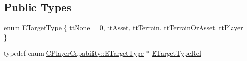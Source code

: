 \subsection*{Public Types}
\begin{DoxyCompactItemize}
\item 
enum \hyperlink{classCPlayerCapability_a9d3450ed1532fd536bd6cbb1e2eef02f}{E\+Target\+Type} \{ \newline
\hyperlink{classCPlayerCapability_a9d3450ed1532fd536bd6cbb1e2eef02fac78f0e806a6b0ead030d63c27c9ce929}{tt\+None} = 0, 
\hyperlink{classCPlayerCapability_a9d3450ed1532fd536bd6cbb1e2eef02facb6ee2a28b5d50b9d3009c272f2881aa}{tt\+Asset}, 
\hyperlink{classCPlayerCapability_a9d3450ed1532fd536bd6cbb1e2eef02fa465193c39da3100a1ce87c4a01a7ec2f}{tt\+Terrain}, 
\hyperlink{classCPlayerCapability_a9d3450ed1532fd536bd6cbb1e2eef02fa67cc6d11bc0aafc1b786bd6557ba4aa2}{tt\+Terrain\+Or\+Asset}, 
\newline
\hyperlink{classCPlayerCapability_a9d3450ed1532fd536bd6cbb1e2eef02fafa6672fe0ac4e39cb5908cd5438b824f}{tt\+Player}
 \}
\item 
typedef enum \hyperlink{classCPlayerCapability_a9d3450ed1532fd536bd6cbb1e2eef02f}{C\+Player\+Capability\+::\+E\+Target\+Type} $\ast$ \hyperlink{classCPlayerCapability_aaf4a5763a2fa5b81c138c52da0888e87}{E\+Target\+Type\+Ref}
\end{DoxyCompactItemize}
